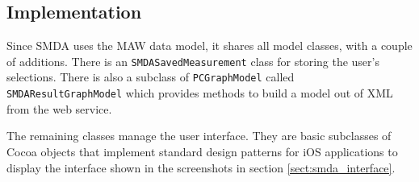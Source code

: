 \subsection{Implementation}
\label{sect:smda_implementation}

Since SMDA uses the MAW data model, it shares all model classes, with a couple
of additions. There is an \texttt{SMDASavedMeasurement} class for storing the
user's selections. There is also a subclass of \texttt{PCGraphModel} called
\texttt{SMDAResultGraphModel} which provides methods to build a model out of XML
from the web service.

The remaining classes manage the user interface. They are basic subclasses of
Cocoa objects that implement standard design patterns for iOS applications to
display the interface shown in the screenshots in section
\ref{sect:smda_interface}.
